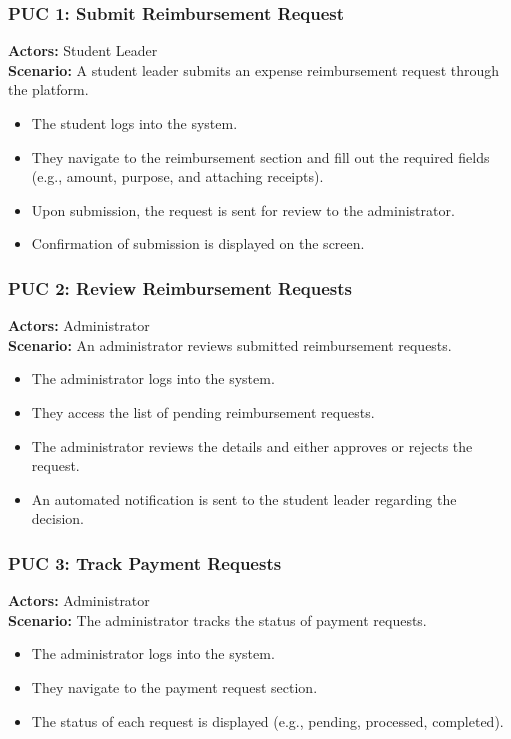 \documentclass[12pt]{article}
\begin{document}
\subsubsection{PUC 1: Submit Reimbursement Request}
\textbf{Actors:} Student Leader \\
\textbf{Scenario:} A student leader submits an expense reimbursement request through the platform.
\begin{itemize}
    \item The student logs into the system.
    \item They navigate to the reimbursement section and fill out the required fields (e.g., amount, purpose, and attaching receipts).
    \item Upon submission, the request is sent for review to the administrator.
    \item Confirmation of submission is displayed on the screen.
\end{itemize}

\subsubsection{PUC 2: Review Reimbursement Requests}
\textbf{Actors:} Administrator \\
\textbf{Scenario:} An administrator reviews submitted reimbursement requests.
\begin{itemize}
    \item The administrator logs into the system.
    \item They access the list of pending reimbursement requests.
    \item The administrator reviews the details and either approves or rejects the request.
    \item An automated notification is sent to the student leader regarding the decision.
\end{itemize}

\subsubsection{PUC 3: Track Payment Requests}
\textbf{Actors:} Administrator \\
\textbf{Scenario:} The administrator tracks the status of payment requests.
\begin{itemize}
    \item The administrator logs into the system.
    \item They navigate to the payment request section.
    \item The status of each request is displayed (e.g., pending, processed, completed).
\end{itemize}
\end{document}
